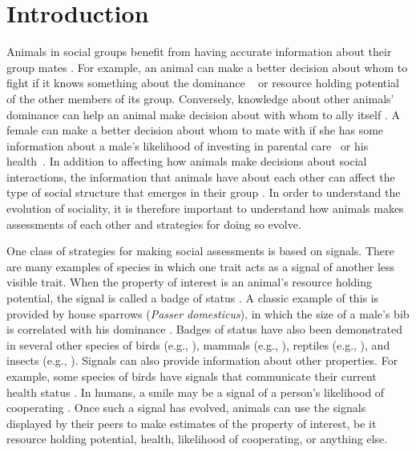 \section*{Introduction} 
Animals in social groups benefit from having accurate information about their group mates \citep{Seyfarth:2010bh}. For example, an animal can make a better decision about whom to fight if it knows something about the dominance ~\citep{Waal:1986ys,Cowlishaw:1990vn,Bergman:2003qf,Seyfarth:2005ve,Flack:2006uq,Hobson:2015uq} or resource holding potential~\citep{Rhijn:1980uq,Freeman:1985kl,Dick:1990cr,Lemel:1993ve,Part:1997ys} of the other members of its group. Conversely, knowledge about other animals' dominance can help an animal make decision about with whom to ally itself \citep{Engh:2005qp}. A female can  make a better decision about whom to mate with if she has some information about a male's likelihood of investing in parental care~\citep{Qvarnstrom:1997fk,McGlothlin:2007au,Olsen:2010uq} or his health~\citep{Folstad:1992kx,Loyau:2005nx}. In addition to affecting how animals make decisions about social interactions, the information that animals have about each other can affect the type of social structure that emerges in their group \citep{Dugatkin:2004hz,Hobson:2015uq,Brush:2018ss}. In order to understand the evolution of sociality, it is therefore important to understand how animals makes assessments of each other and strategies for doing so evolve.  

One class of strategies for making social assessments is based on signals. There are many examples of species in which one trait acts as a signal of another less visible trait. When the property of interest is an animal's resource holding potential, the signal is called a badge of status \citep{dawkins1978signals,Rohwer:1981vn,Rohwer:1982fk,Ripoll:2004vn,sheehan2016evotradeoff}. A classic example of this is provided by house sparrows (\emph{Passer domesticus}), in which the size of a male's bib is correlated with his dominance \citep{Veiga:1993fk,Veiga:1995ys}. Badges of status have also been demonstrated in several other species of birds (e.g., \citep{Remy:2010fk,Olsen:2010uq,Lemel:1993ve,Tibbetts:2009kx}), mammals (e.g., \citep{Gerald:2001zm}), reptiles (e.g., \citep{Fox:1990hd}), and insects (e.g., \citep{Tibbetts:2004kx}). Signals can also provide information about other properties. For example, some species of birds have signals that communicate their current health status \citep{Folstad:1992kx,Loyau:2005nx}. In humans, a smile may be a signal of a person's likelihood of cooperating \citep{Schug:2010be}. Once such a signal has evolved, animals can use the signals displayed by their peers to make estimates of the property of interest, be it resource holding potential, health, likelihood of cooperating, or anything else.


